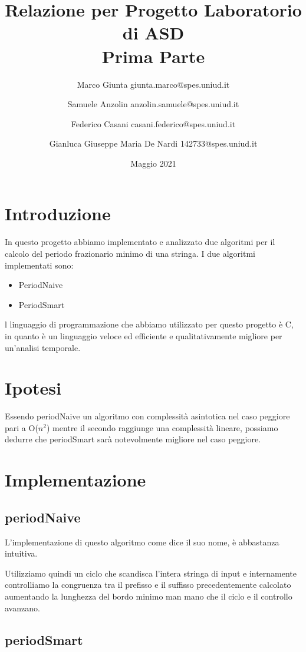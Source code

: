 \documentclass[a4paper]{article}
\title{Relazione per Progetto Laboratorio di ASD \\
         \large Prima Parte}
\date{Maggio 2021}
\author{
Marco Giunta giunta.marco@spes.uniud.it
\and
Samuele Anzolin anzolin.samuele@spes.uniud.it
\and
Federico Casani casani.federico@spes.uniud.it
\and
Gianluca Giuseppe Maria De Nardi 142733@spes.uniud.it 
}
\begin{document}
\maketitle
\newpage

\tableofcontents
\newpage

\section{Introduzione}
In questo progetto abbiamo implementato e analizzato due algoritmi per il calcolo
del periodo frazionario minimo di una stringa. I due algoritmi implementati sono:

\begin{itemize}
  \item PeriodNaive
  \item PeriodSmart
\end{itemize}

l linguaggio di programmazione che abbiamo utilizzato per questo progetto è C,
in quanto è un linguaggio veloce ed efficiente e qualitativamente migliore per un’analisi temporale.


\section{Ipotesi}
Essendo periodNaive un algoritmo con complessità asintotica nel caso peggiore
pari a O(\(n^2\)) mentre il secondo raggiunge una complessità lineare, possiamo dedurre
che periodSmart sarà notevolmente migliore nel caso peggiore.

\section{Implementazione}

\subsection{periodNaive}

L’implementazione di questo algoritmo come dice il suo nome, è abbastanza intuitiva.

Utilizziamo quindi un ciclo che scandisca l’intera stringa di input e internamente controlliamo la congruenza tra il prefisso e il suffisso precedentemente calcolato aumentando la lunghezza del bordo minimo man mano che il ciclo e il controllo avanzano.

\subsection{periodSmart}
\end{document}
